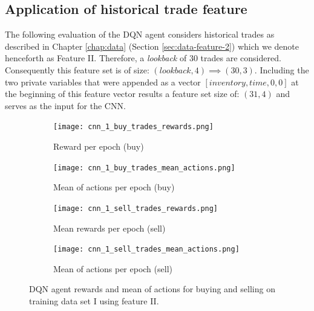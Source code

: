 \subsection{Application of historical trade feature}

The following evaluation of the DQN agent considers historical trades as described in Chapter \ref{chap:data} (Section \ref{sec:data-feature-2}) which we denote henceforth as Feature II.
Therefore, a \textit{lookback} of 30 trades are considered.
Consequently this feature set is of size: $(lookback, 4) \implies (30, 3)$.
Including the two private variables that were appended as a vector $[inventory, time, 0, 0]$ at the beginning of this feature vector results a feature set size of: $(31, 4)$ and serves as the input for the CNN.

\begin{figure}[H]
    \centering
    \begin{subfigure}[b]{0.45\textwidth}
        \texttt{[image: cnn\_1\_buy\_trades\_rewards.png]}
        \caption{Reward per epoch (buy)}
        \label{fig:analysis-dqn-1-trades-reward-buy}
    \end{subfigure}
    \begin{subfigure}[b]{0.45\textwidth}
        \texttt{[image: cnn\_1\_buy\_trades\_mean\_actions.png]}
        \caption{Mean of actions per epoch (buy)}
        \label{fig:analysis-dqn-1-trades-action-buy}
    \end{subfigure}
    \begin{subfigure}[b]{0.45\textwidth}
        \texttt{[image: cnn\_1\_sell\_trades\_rewards.png]}
        \caption{Mean rewards per epoch (sell)}
        \label{fig:analysis-dqn-1-trades-reward-sell}
    \end{subfigure}
    \begin{subfigure}[b]{0.45\textwidth}
        \texttt{[image: cnn\_1\_sell\_trades\_mean\_actions.png]}
        \caption{Mean of actions per epoch (sell)}
        \label{fig:analysis-dqn-1-trades-action-sell}
    \end{subfigure}
    \caption{DQN agent rewards and mean of actions for buying and selling on training data set I using feature II.}
    \label{fig:analysis-dqn-1-trades}
\end{figure}

